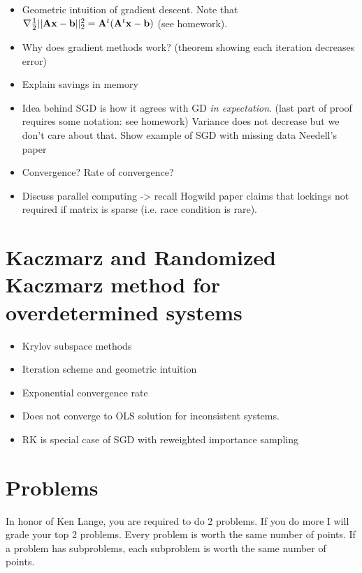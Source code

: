 \documentclass[./some_latex_template.tex]{subfiles}
\begin{document}
\begin{itemize}
	\item Geometric intuition of gradient descent. Note that $\nabla \frac{1}{2}||\mathbf{A}\mathbf{x} - \mathbf{b}||_2^2 = \mathbf{A}^t(\mathbf{A}^t\mathbf{x} - \mathbf{b})$ (see homework).
	\item Why does gradient methods work? (theorem showing each iteration decreases error)
	\item Explain savings in memory
	\item Idea behind SGD is how it agrees with GD \textit{in expectation}. (last part of proof requires some notation: see homework) Variance does not decrease but we don't care about that. Show example of SGD with missing data Needell's paper
	\item Convergence? Rate of convergence?
	\item Discuss parallel computing -> recall Hogwild paper claims that lockings not required if matrix is sparse (i.e. race condition is rare). 
\end{itemize}

\section{Kaczmarz and Randomized Kaczmarz method for overdetermined systems}

\begin{itemize}
	\item Krylov subspace methods
	\item Iteration scheme and geometric intuition
	\item Exponential convergence rate
	\item Does not converge to OLS solution for inconsistent systems.
	\item RK is special case of SGD with reweighted importance sampling
\end{itemize}

\section{Problems}
In honor of Ken Lange, you are required to do 2 problems. If you do more I will grade your top 2 problems. Every problem is worth the same number of points. If a problem has subproblems, each subproblem is worth the same number of points.
\end{document}
